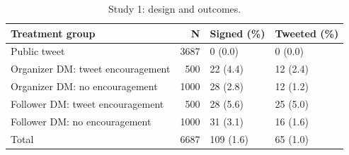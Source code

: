 \begin{table}

\caption{Study 1: design and outcomes.}
\centering
\begin{tabular}[t]{lrll}
\toprule
Treatment group & N & Signed (\%) & Tweeted (\%)\\
\midrule
Public tweet & 3687 & 0 (0.0) & 0 (0.0)\\
Organizer DM: tweet encouragement & 500 & 22 (4.4) & 12 (2.4)\\
Organizer DM: no encouragement & 1000 & 28 (2.8) & 12 (1.2)\\
Follower DM: tweet encouragement & 500 & 28 (5.6) & 25 (5.0)\\
Follower DM: no encouragement & 1000 & 31 (3.1) & 16 (1.6)\\
\addlinespace
Total & 6687 & 109 (1.6) & 65 (1.0)\\
\bottomrule
\end{tabular}
\end{table}
